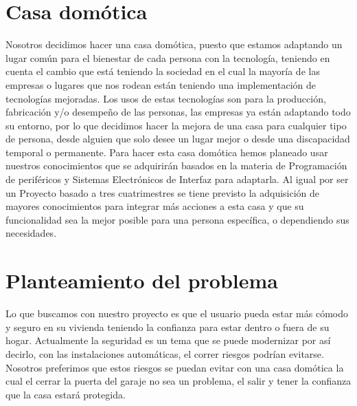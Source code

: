 \documentclass[12pt,a4paper]{article}
\begin{document}
  \section{Casa domótica}
  Nosotros decidimos hacer una casa domótica, puesto que estamos adaptando un lugar común para el bienestar de cada persona con la tecnología, teniendo en cuenta el cambio que está teniendo la sociedad en el cual la mayoría de las empresas o lugares que nos rodean están teniendo una implementación de tecnologías mejoradas.
Los usos de estas tecnologías son para la producción, fabricación y/o desempeño de las personas, las empresas ya están adaptando todo su entorno, por lo que decidimos hacer la mejora de una casa para cualquier tipo de persona, desde alguien que solo desee un lugar mejor o desde una discapacidad temporal o permanente.
Para hacer esta casa domótica hemos planeado usar nuestros conocimientos que se adquirirán basados en la materia de Programación de periféricos y Sistemas Electrónicos de Interfaz para adaptarla.
 Al igual por ser un Proyecto basado a tres cuatrimestres se tiene previsto la adquisición de mayores conocimientos para integrar más acciones a esta casa y que su funcionalidad sea la mejor posible para una persona específica, o dependiendo sus necesidades.
 \section{Planteamiento del problema }
 Lo que buscamos con nuestro proyecto es que el usuario pueda estar más cómodo y seguro en su vivienda teniendo la confianza para estar dentro o fuera de su hogar.
Actualmente la seguridad es un tema que se puede modernizar por así decirlo, con las instalaciones automáticas, el correr riesgos podrían evitarse. 
 Nosotros preferimos que estos riesgos se puedan evitar con una casa domótica la cual el cerrar la puerta del garaje no sea un problema, el salir y tener la confianza que la casa estará protegida. 
\end{document}
